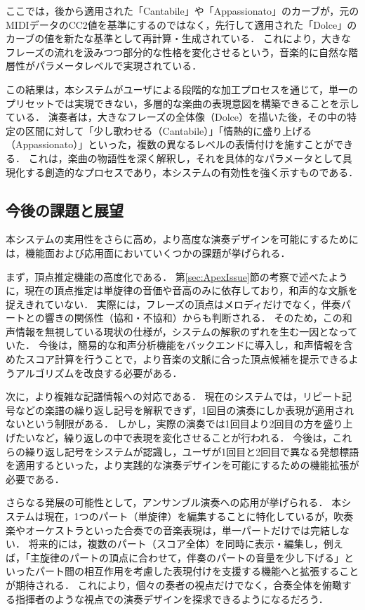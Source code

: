 ここでは，後から適用された「Cantabile」や「Appassionato」のカーブが，元のMIDIデータのCC2値を基準にするのではなく，先行して適用された「Dolce」のカーブの値を新たな基準として再計算・生成されている．
これにより，大きなフレーズの流れを汲みつつ部分的な性格を変化させるという，音楽的に自然な階層性がパラメータレベルで実現されている．

この結果は，本システムがユーザによる段階的な加工プロセスを通じて，単一のプリセットでは実現できない，多層的な楽曲の表現意図を構築できることを示している．
演奏者は，大きなフレーズの全体像（Dolce）を描いた後，その中の特定の区間に対して「少し歌わせる（Cantabile）」「情熱的に盛り上げる（Appassionato）」といった，複数の異なるレベルの表情付けを施すことができる．
これは，楽曲の物語性を深く解釈し，それを具体的なパラメータとして具現化する創造的なプロセスであり，本システムの有効性を強く示すものである．

\subsection{今後の課題と展望}

本システムの実用性をさらに高め，より高度な演奏デザインを可能にするためには，機能面および応用面においていくつかの課題が挙げられる．

まず，頂点推定機能の高度化である．
第\ref{sec:ApexIssue}節の考察で述べたように，現在の頂点推定は単旋律の音価や音高のみに依存しており，和声的な文脈を捉えきれていない．
実際には，フレーズの頂点はメロディだけでなく，伴奏パートとの響きの関係性（協和・不協和）からも判断される．
そのため，この和声情報を無視している現状の仕様が，システムの解釈のずれを生む一因となっていた．
今後は，簡易的な和声分析機能をバックエンドに導入し，和声情報を含めたスコア計算を行うことで，より音楽の文脈に合った頂点候補を提示できるようアルゴリズムを改良する必要がある．

次に，より複雑な記譜情報への対応である．
現在のシステムでは，リピート記号などの楽譜の繰り返し記号を解釈できず，1回目の演奏にしか表現が適用されないという制限がある．
しかし，実際の演奏では1回目より2回目の方を盛り上げたいなど，繰り返しの中で表現を変化させることが行われる．
今後は，これらの繰り返し記号をシステムが認識し，ユーザが1回目と2回目で異なる発想標語を適用するといった，より実践的な演奏デザインを可能にするための機能拡張が必要である．

さらなる発展の可能性として，アンサンブル演奏への応用が挙げられる．
本システムは現在，1つのパート（単旋律）を編集することに特化しているが，吹奏楽やオーケストラといった合奏での音楽表現は，単一パートだけでは完結しない．
将来的には，複数のパート（スコア全体）を同時に表示・編集し，例えば，「主旋律のパートの頂点に合わせて，伴奏のパートの音量を少し下げる」といったパート間の相互作用を考慮した表現付けを支援する機能へと拡張することが期待される．
これにより，個々の奏者の視点だけでなく，合奏全体を俯瞰する指揮者のような視点での演奏デザインを探求できるようになるだろう．

